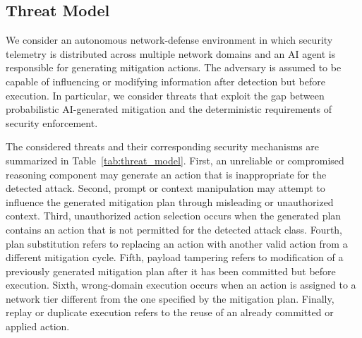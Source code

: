 \documentclass[10pt, conference]{IEEEtran}
\begin{document}
\subsection{Threat Model}

We consider an autonomous network-defense environment in which security
telemetry is distributed across multiple network domains and an AI agent
is responsible for generating mitigation actions. The adversary is
assumed to be capable of influencing or modifying information after
detection but before execution. In particular, we consider threats that
exploit the gap between probabilistic AI-generated mitigation and the
deterministic requirements of security enforcement.

The considered threats and their corresponding security mechanisms are
summarized in Table~\ref{tab:threat_model}. First, an unreliable or
compromised reasoning component may generate an action that is
inappropriate for the detected attack. Second, prompt or context
manipulation may attempt to influence the generated mitigation plan
through misleading or unauthorized context. Third, unauthorized action
selection occurs when the generated plan contains an action that is not
permitted for the detected attack class. Fourth, plan substitution refers
to replacing an action with another valid action from a different
mitigation cycle. Fifth, payload tampering refers to modification of a
previously generated mitigation plan after it has been committed but
before execution. Sixth, wrong-domain execution occurs when an action is
assigned to a network tier different from the one specified by the
mitigation plan. Finally, replay or duplicate execution refers to the
reuse of an already committed or applied action.
\end{document}

